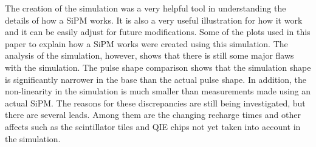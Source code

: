 The creation of the simulation was a very helpful tool in understanding the details of how a SiPM works. It is also a very useful illustration for how it work and it can be easily adjust for future modifications. Some of the plots used in this paper to explain how a SiPM works were created using this simulation. The analysis of the simulation, however, shows that there is still some major flaws with the simulation. The pulse shape comparison shows that the simulation shape is significantly narrower in the base than the actual pulse shape. In addition, the non-linearity in the simulation is much smaller than measurements made using an actual SiPM. The reasons for these discrepancies are still being investigated, but there are several leads. Among them are the changing recharge times and other affects such as the scintillator tiles and QIE chips not yet taken into account in the simulation. 